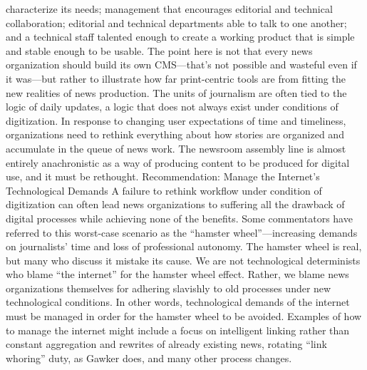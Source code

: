characterize its needs; management that encourages editorial and technical collaboration;
editorial and technical departments able to talk to one another; and
a technical staff talented enough to create a working product that is simple and
stable enough to be usable. The point here is not that every news organization
should build its own CMS—that’s not possible and wasteful even if it was—but
rather to illustrate how far print-centric tools are from fitting the new realities
of news production.
The units of journalism are often tied to the logic of daily updates, a logic that
does not always exist under conditions of digitization. In response to changing
user expectations of time and timeliness, organizations need to rethink everything
about how stories are organized and accumulate in the queue of news
work. The newsroom assembly line is almost entirely anachronistic as a way of
producing content to be produced for digital use, and it must be rethought.
Recommendation: Manage the Internet’s Technological Demands
A failure to rethink workflow under condition of digitization can often
lead news organizations to suffering all the drawback of digital processes
while achieving none of the benefits. Some commentators have
referred to this worst-case scenario as the ``hamster wheel''—increasing
demands on journalists’ time and loss of professional autonomy.
The hamster wheel is real, but many who discuss it mistake its cause.
We are not technological determinists who blame ``the internet'' for
the hamster wheel effect. Rather, we blame news organizations themselves
for adhering slavishly to old processes under new technological
conditions. In other words, technological demands of the internet
must be managed in order for the hamster wheel to be avoided. Examples
of how to manage the internet might include a focus on intelligent
linking rather than constant aggregation and rewrites of already
existing news, rotating ``link whoring'' duty, as Gawker does, and many
other process changes.

